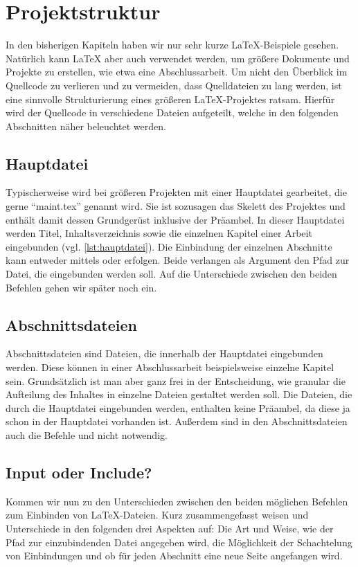 \section{Projektstruktur}
\label{sec:projektstruktur}
In den bisherigen Kapiteln haben wir nur sehr kurze \LaTeX{}-Beispiele gesehen. Natürlich kann \LaTeX{} aber auch verwendet werden, um größere Dokumente und Projekte zu erstellen, wie etwa eine Abschlussarbeit. 
Um nicht den Überblick im Quellcode zu verlieren und zu vermeiden, dass Quelldateien zu lang werden, ist eine sinnvolle Strukturierung eines größeren \LaTeX{}-Projektes ratsam. Hierfür wird der Quellcode in verschiedene Dateien aufgeteilt, welche in den folgenden Abschnitten näher beleuchtet werden.

 \subsection{Hauptdatei} Typischerweise wird bei größeren Projekten mit einer Hauptdatei gearbeitet, die gerne \enquote{maint.tex} genannt wird. Sie ist sozusagen das Skelett des Projektes und enthält damit dessen Grundgerüst inklusive der Präambel. In dieser Hauptdatei werden Titel, Inhaltsverzeichnis sowie die einzelnen Kapitel einer Arbeit eingebunden (vgl. \cref{lst:hauptdatei}). Die Einbindung der einzelnen Abschnitte kann entweder mittels \texttt{} oder \texttt{} erfolgen. Beide verlangen als Argument den Pfad zur Datei, die eingebunden werden soll. Auf die Unterschiede zwischen den beiden Befehlen gehen wir später noch ein.
  
 
 \subsection{Abschnittsdateien}
 Abschnittsdateien sind Dateien, die innerhalb der Hauptdatei eingebunden werden. Diese können in einer Abschlussarbeit beispielsweise einzelne Kapitel sein. Grundsätzlich ist man aber ganz frei in der Entscheidung, wie granular die Aufteilung des Inhaltes in einzelne Dateien gestaltet werden soll.
 Die Dateien, die durch die Hauptdatei eingebunden werden, enthalten keine Präambel, da diese ja schon in der Hauptdatei vorhanden ist. Außerdem sind in den Abschnittsdateien auch die Befehle \texttt{} und \texttt{} nicht notwendig. 
 
 \subsection{Input oder Include?}
Kommen wir nun zu den Unterschieden zwischen den beiden möglichen Befehlen zum Einbinden von \LaTeX-Dateien. Kurz zusammengefasst weisen \texttt{} und \texttt{} Unterschiede in den folgenden drei Aspekten auf: Die Art und Weise, wie der Pfad zur einzubindenden Datei angegeben wird, die Möglichkeit der Schachtelung von Einbindungen und ob für jeden Abschnitt eine neue Seite angefangen wird.
 
